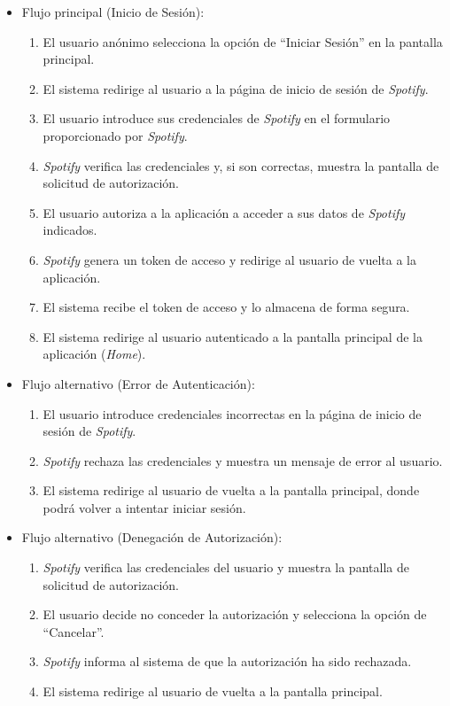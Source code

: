 \begin{itemize}
    \item Flujo principal (Inicio de Sesión):
          \begin{enumerate}
              \item El usuario anónimo selecciona la opción de ``Iniciar Sesión'' en la pantalla principal.
              \item El sistema redirige al usuario a la página de inicio de sesión de \textit{Spotify}.
              \item El usuario introduce sus credenciales de \textit{Spotify} en el formulario proporcionado por \textit{Spotify}.
              \item \textit{Spotify} verifica las credenciales y, si son correctas, muestra la pantalla de solicitud de autorización.
              \item El usuario autoriza a la aplicación a acceder a sus datos de \textit{Spotify} indicados.
              \item \textit{Spotify} genera un token de acceso y redirige al usuario de vuelta a la aplicación.
              \item El sistema recibe el token de acceso y lo almacena de forma segura.
              \item El sistema redirige al usuario autenticado a la pantalla principal de la aplicación (\textit{Home}).
          \end{enumerate}
    \item Flujo alternativo (Error de Autenticación):
          \begin{enumerate}
              \item El usuario introduce credenciales incorrectas en la página de inicio de sesión de \textit{Spotify}.
              \item \textit{Spotify} rechaza las credenciales y muestra un mensaje de error al usuario.
              \item El sistema redirige al usuario de vuelta a la pantalla principal, donde podrá volver a intentar iniciar sesión.
          \end{enumerate}
    \item Flujo alternativo (Denegación de Autorización):
          \begin{enumerate}
              \item \textit{Spotify} verifica las credenciales del usuario y muestra la pantalla de solicitud de autorización.
              \item El usuario decide no conceder la autorización y selecciona la opción de ``Cancelar''.
              \item \textit{Spotify} informa al sistema de que la autorización ha sido rechazada.
              \item El sistema redirige al usuario de vuelta a la pantalla principal.
          \end{enumerate}
\end{itemize}

